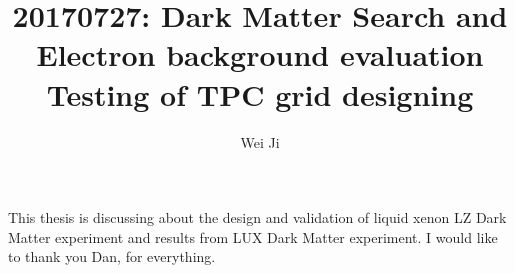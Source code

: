 \documentclass{report}
\begin{document}
\title{20170727: Dark Matter Search and Electron background evaluation\\
            Testing of TPC grid designing}
\author{Wei Ji}
\fourthreader{} %
%
 
\beforepreface
{}
This thesis is discussing about the design and validation of liquid xenon LZ Dark Matter experiment and results from LUX Dark Matter experiment.   
I would like to thank you Dan, for everything.
\afterpreface
%
%
%
%
%
%
%
%
%
%
%
%
%

%

\appendix
%
%
%
%
%

%
%

\printbibliography[heading=bibintoc]
\end{document}
